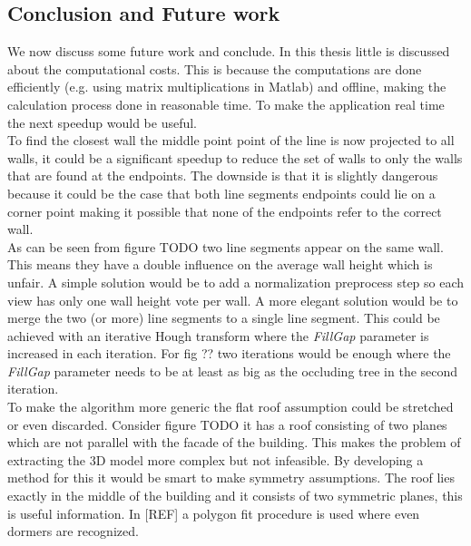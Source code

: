 \documentclass[10pt]{article}
\begin{document}



\subsection{Conclusion and Future work}
We now discuss some future work and conclude.  In this thesis little is discussed about the computational costs. This is because the computations are done efficiently (e.g. using matrix multiplications in Matlab) and offline, making the calculation process done in reasonable time. To make the application real time the next speedup would be useful.\\
To find the closest wall the middle point point of the line is now projected to all walls, it could be a significant speedup to reduce the set of walls to only the walls that are found at the endpoints. The downside is that it is slightly dangerous because it could be the case that both line segments endpoints could lie on a corner point making it possible that none of the endpoints refer to the correct wall.\\

As can be seen from figure TODO%
two line segments appear on the same wall. This means they have a double influence on the average wall height which is unfair. A simple solution would be to add a normalization preprocess step so each view has only one wall height vote per wall. A more elegant solution would be to merge the two (or more) line segments to a single line segment. This could be achieved with an iterative Hough transform where the \emph{FillGap} parameter is increased in each iteration. For fig ?? %
two iterations would be enough where the \emph{FillGap} parameter needs to be at least as big as the occluding tree in the second iteration.\\
To make the algorithm more generic the flat roof assumption could be stretched or even discarded.
Consider figure TODO %
it has a roof consisting of two planes which are not parallel with the facade of the building. This makes the problem of extracting the 3D model more complex but not 
infeasible. By developing a method for this it would be smart to make symmetry assumptions. The roof lies exactly in the middle of the building and it consists of two symmetric planes, this is useful information. In 
[REF] a polygon fit procedure is used where even dormers are recognized.\\
\end{document}
